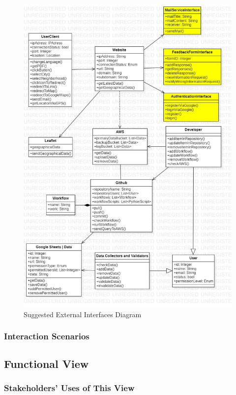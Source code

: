 \begin{figure}[H]
  \centering
  \includegraphics[width=\linewidth]{img/external-interfaces-diagram-s5.jpg}
  \caption{Suggested External Interfaces Diagram}
\end{figure}

\subsubsection{Interaction Scenarios}

\subsection{Functional View}

\subsubsection{Stakeholders' Uses of This View}

